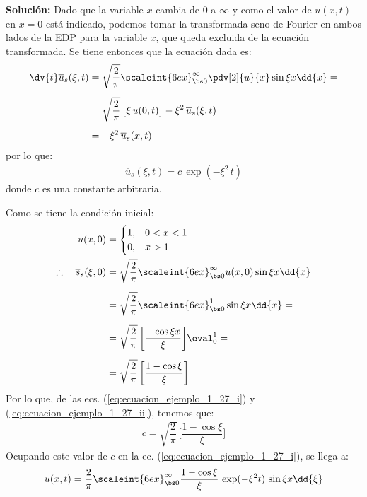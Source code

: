 \noindent
\textbf{Solución: } Dado que la variable $x$ cambia de $0$ a $\infty$ y como el valor de $u(x, t)$ en $x = 0$ está indicado, podemos tomar la transformada seno de Fourier en ambos lados de la EDP para la variable $x$, que queda excluida de la ecuación transformada. Se tiene entonces que la ecuación dada es:
\begin{align*}
\dv{t} \overline{u}_{s} (\xi, t) &= \sqrt{\dfrac{2}{\pi}} \scaleint{6ex}_{\bs 0}^{\infty} \pdv[2]{u}{x} \sin \xi x \dd{x} = \\[0.5em]
&= \sqrt{\dfrac{2}{\pi}} \, \big[ \xi \, u(0, t) \big] - \xi^{2} \, \overline{u}_{s} (\xi, t) = \\[0.5em]
&= - \xi^{2} \, \overline{u}_{s} (x , t)
\end{align*}
por lo que:
\begin{align}
\overline{u}_{s} (\xi, t) = c \, \exp(-\xi^{2} \, t)
\label{eq:ecuacion_ejemplo_1_27_i}
\end{align}
donde $c$ es una constante arbitraria.
\par
Como se tiene la condición inicial:
\begin{align}
\begin{aligned}
u (x, 0) &= \begin{cases}
1, & 0 < x < 1  \\
0, & x > 1
\end{cases}
\\
\therefore \quad \overline{s}_{s} (\xi, 0) &= \sqrt{\dfrac{2}{\pi}} \scaleint{6ex}_{\bs 0}^{\infty} u (x, 0) \sin \xi x \dd{x} \\[0.5em]
&= \sqrt{\dfrac{2}{\pi}} \scaleint{6ex}_{\bs 0}^{1} \sin \xi x \dd{x} = \\[0.5em]
&= \sqrt{\dfrac{2}{\pi}} \, \bigg[ \dfrac{- \cos \xi x}{\xi} \bigg] \eval_{0}^{1} = \\[0.5em]
&= \sqrt{\dfrac{2}{\pi}} \, \bigg[ \dfrac{1 - \cos \xi}{\xi} \bigg]
\end{aligned}
\label{eq:ecuacion_ejemplo_1_27_ii}
\end{align}
Por lo que, de las ecs. (\ref{eq:ecuacion_ejemplo_1_27_i}) y (\ref{eq:ecuacion_ejemplo_1_27_ii}), tenemos que:
\begin{align*}
c = \sqrt{\dfrac{2}{\pi}} \, \bigg[ \dfrac{1 - \cos \xi}{\xi} \bigg]
\end{align*}
Ocupando este valor de $c$ en la ec. (\ref{eq:ecuacion_ejemplo_1_27_i}), se llega a:
\begin{align*}
u (x, t) = \dfrac{2}{\pi} \scaleint{6ex}_{\bs 0}^{\infty} \dfrac{1 - \cos \xi}{\xi} \, \exp(-\xi^{2} t) \, \sin \xi x\dd{\xi}
\end{align*}
